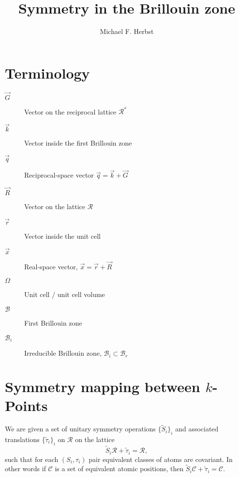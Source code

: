 \documentclass[a4paper]{article}
\begin{document}
\title{Symmetry in the Brillouin zone}
\author{Michael F. Herbst}
\maketitle


\section{Terminology}
\begin{description}
	\item[$\vec{G}$] Vector on the reciprocal lattice $\mathcal{R}^\ast$
	\item[$\vec{k}$] Vector inside the first Brillouin zone
	\item[$\vec{q}$] Reciprocal-space vector $\vec{q} = \vec{k} + \vec{G}$
	\item[$\vec{R}$] Vector on the lattice $\mathcal{R}$
	\item[$\vec{r}$] Vector inside the unit cell
	\item[$\vec{x}$] Real-space vector, $\vec{x} = \vec{r} + \vec{R}$
	\item[$\Omega$] Unit cell / unit cell volume
	\item[$\mathcal{B}$] First Brillouin zone
	\item[$\mathcal{B}_i$] Irreducible Brillouin zone,
		$\mathcal{B}_i \subset \mathcal{B}_r$
\end{description}

\section{Symmetry mapping between $k$-Points}
We are given a set of unitary symmetry operations $\{\tilde{S}_i\}_i$
and associated translations $\{\tilde{\tau}_i\}_i$ on $\mathcal{R}$
on the lattice
\[
	\tilde{S}_i \mathcal{R} + \tilde{\tau}_i = \mathcal{R},
\]
such that for each $\left( S_i, \tau_i \right)$ pair
equivalent classes of atoms are covariant.
In other words if $\mathcal{C}$ is a set of equivalent atomic positions,
then $\tilde{S}_i \mathcal{C} + \tilde{\tau}_i = \mathcal{C}$.
\end{document}
